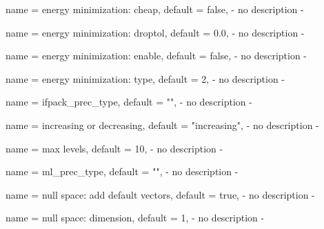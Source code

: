 \begin{parameter}{
    name    = {energy minimization: cheap},
    default = {false},
}
- no description -
\end{parameter}

\begin{parameter}{
    name    = {energy minimization: droptol},
    default = {0.0},
}
- no description -
\end{parameter}

\begin{parameter}{
    name    = {energy minimization: enable},
    default = {false},
}
- no description -
\end{parameter}

\begin{parameter}{
    name    = {energy minimization: type},
    default = {2},
}
- no description -
\end{parameter}

\begin{parameter}{
    name    = {ifpack_prec_type},
    default = {""},
}
- no description -
\end{parameter}

\begin{parameter}{
    name    = {increasing or decreasing},
    default = {"increasing"},
}
- no description -
\end{parameter}

\begin{parameter}{
    name    = {max levels},
    default = {10},
}
- no description -
\end{parameter}

\begin{parameter}{
    name    = {ml_prec_type},
    default = {""},
}
- no description -
\end{parameter}

\begin{parameter}{
    name    = {null space: add default vectors},
    default = {true},
}
- no description -
\end{parameter}

\begin{parameter}{
    name    = {null space: dimension},
    default = {1},
}
- no description -
\end{parameter}

